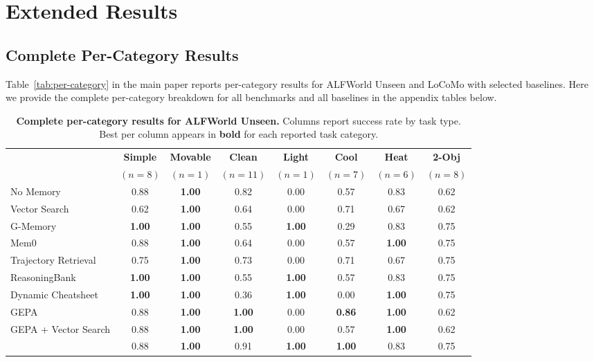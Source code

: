 
\section{Extended Results}
\label{app:extended-results}

\subsection{Complete Per-Category Results}
\label{app:per-category}

Table~\ref{tab:per-category} in the main paper reports per-category results for ALFWorld Unseen and LoCoMo with selected baselines.
Here we provide the complete per-category breakdown for all benchmarks and all baselines in the appendix tables below.

\begin{table}[!htbp]
\centering
\caption{\textbf{Complete per-category results for ALFWorld Unseen.}
Columns report success rate by task type.
Best per column appears in \textbf{bold} for each reported task category.}
\label{tab:per-cat-alf-unseen}
\small
\setlength{\tabcolsep}{4pt}
\begin{tabular}{@{}l cccccc c@{}}
\toprule
& \textbf{Simple} & \textbf{Movable} & \textbf{Clean} & \textbf{Light} & \textbf{Cool} & \textbf{Heat} & \textbf{2-Obj} \\
& \footnotesize$(n{=}8)$ & \footnotesize$(n{=}1)$ & \footnotesize$(n{=}11)$ & \footnotesize$(n{=}1)$ & \footnotesize$(n{=}7)$ & \footnotesize$(n{=}6)$ & \footnotesize$(n{=}8)$ \\
\midrule
No Memory            & 0.88 & \textbf{1.00} & 0.82 & 0.00 & 0.57 & 0.83 & 0.62 \\
Vector Search        & 0.62 & \textbf{1.00} & 0.64 & 0.00 & 0.71 & 0.67 & 0.62 \\
G-Memory             & \textbf{1.00} & \textbf{1.00} & 0.55 & \textbf{1.00} & 0.29 & 0.83 & 0.75 \\
Mem0                 & 0.88 & \textbf{1.00} & 0.64 & 0.00 & 0.57 & \textbf{1.00} & 0.75 \\
Trajectory Retrieval & 0.75 & \textbf{1.00} & 0.73 & 0.00 & 0.71 & 0.67 & 0.75 \\
ReasoningBank        & \textbf{1.00} & \textbf{1.00} & 0.55 & \textbf{1.00} & 0.57 & 0.83 & 0.75 \\
Dynamic Cheatsheet   & \textbf{1.00} & \textbf{1.00} & 0.36 & \textbf{1.00} & 0.00 & \textbf{1.00} & 0.75 \\
GEPA                 & 0.88 & \textbf{1.00} & \textbf{1.00} & 0.00 & \textbf{0.86} & \textbf{1.00} & 0.62 \\
GEPA + Vector Search & 0.88 & \textbf{1.00} & \textbf{1.00} & 0.00 & 0.57 & \textbf{1.00} & 0.62 \\
\rowcolor{green!10}
\sysname{}           & 0.88 & \textbf{1.00} & 0.91 & \textbf{1.00} & \textbf{1.00} & 0.83 & 0.75 \\
\bottomrule
\end{tabular}
\end{table}


